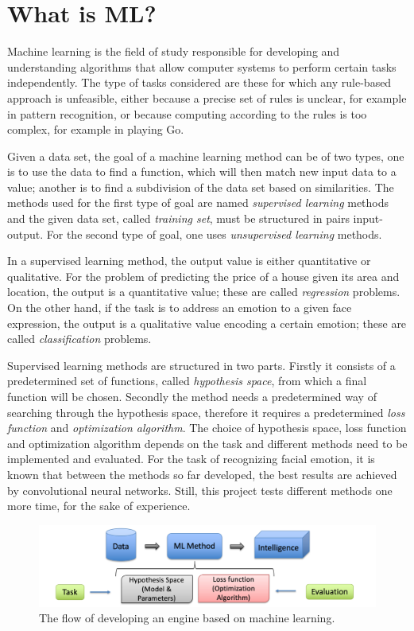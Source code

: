\section{What is ML?}

Machine learning is the field of study responsible for developing and understanding algorithms that allow computer systems to perform certain tasks independently. The type of tasks considered are these for which any rule-based approach is unfeasible, either because a precise set of rules is unclear, for example in pattern recognition, or because computing according to the rules is too complex, for example in playing Go. 

Given a data set, the goal of a machine learning method can be of two types, one is to use the data to find a function, which will then match new input data to a value; another is to find a subdivision of the data set based on similarities. The methods used for the first type of goal are named \textit{supervised learning} methods and the given data set, called \textit{training set}, must be structured in pairs input-output. For the second type of goal, one uses \textit{unsupervised learning} methods.  

In a supervised learning method, the output value is either quantitative or qualitative. For the problem of predicting the price of a house given its area and location, the output is a quantitative value; these are called \textit{regression} problems. On the other hand, if the task is to address an emotion to a given face expression, the output is a qualitative value encoding a certain emotion; these are called \textit{classification} problems.

Supervised learning methods are structured in two parts. Firstly it consists of a predetermined set of functions, called \textit{hypothesis space}, from which a final function will be chosen. Secondly the method needs a predetermined way of searching through the hypothesis space, therefore it requires a predetermined \textit{loss function} and \textit{optimization algorithm}. The choice of hypothesis space, loss function and optimization algorithm depends on the task and different methods need to be implemented and evaluated. For the task of recognizing facial emotion, it is known that between the methods so far developed, the best results are achieved by convolutional neural networks. Still, this project tests different methods one more time, for the sake of experience.

\begin{figure}[hbtp]
	\centering
	\includegraphics[width=1\textwidth]{./Images/MLPipe}
	\caption{The flow of developing an engine based on machine learning.}
	\label{fig:Datensatz - unbearbeitet}
\end{figure}


